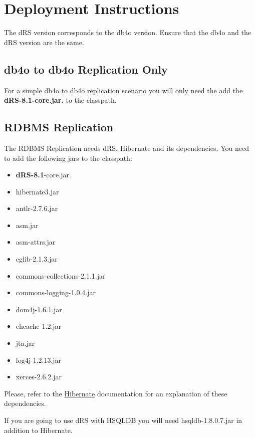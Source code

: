 
\chapter{Deployment Instructions}
\label{drs:db4o-replication-system-drs-deployment-instructions}

The dRS version corresponds to the db4o version. Ensure that the db4o and the dRS version are the same.

\section*{db4o to db4o Replication Only}

For a simple db4o to db4o replication scenario you will only need the add the \textbf{dRS-8.1-core.jar.} to the classpath.

\section*{RDBMS Replication}

The RDBMS Replication needs dRS, Hibernate and its dependencies. You need to add the following jars to the classpath:

\begin{itemize}
\item \textbf{dRS-8.1}-core.jar.\textbf{}
\item hibernate3.jar
\item antlr-2.7.6.jar
\item asm.jar
\item asm-attrs.jar
\item cglib-2.1.3.jar
\item commons-collections-2.1.1.jar
\item commons-logging-1.0.4.jar
\item dom4j-1.6.1.jar
\item ehcache-1.2.jar
\item jta.jar
\item log4j-1.2.13.jar
\item xerces-2.6.2.jar
\end{itemize}

Please, refer to the \href{http://www.hibernate.org/}{Hibernate} documentation for an explanation of these dependencies.

If you are going to use dRS with HSQLDB you will need hsqldb-1.8.0.7.jar in addition to Hibernate.


